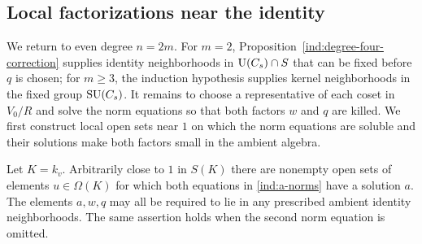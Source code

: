 \subsection{Local factorizations near the identity}

We return to even degree $n=2m$. For $m=2$,
Proposition~\ref{ind:degree-four-correction} supplies identity neighborhoods
in $\operatorname{U}(C_s)\cap S$ that can be fixed before $q$ is chosen; for $m\geq3$,
the induction hypothesis supplies kernel neighborhoods in the fixed
group $\operatorname{SU}(C_s)$. It remains to choose a representative of each coset in
$V_0/R$ and solve the norm equations so that both factors $w$ and $q$
are killed. We first construct local open sets near $1$ on which the norm
equations are soluble and their solutions make both factors small in the
ambient algebra.

\begin{lemma}\label{ind:local-near-one}
Let $K=k_v$.  Arbitrarily close to $1$ in $S(K)$ there are nonempty
open sets of elements $u\in\Omega(K)$ for which both equations in
\eqref{ind:a-norms} have a solution $a$.  The elements $a,w,q$ may all
be required to lie in any prescribed ambient identity neighborhoods.
The same assertion holds when the second norm equation is omitted.
\end{lemma}

